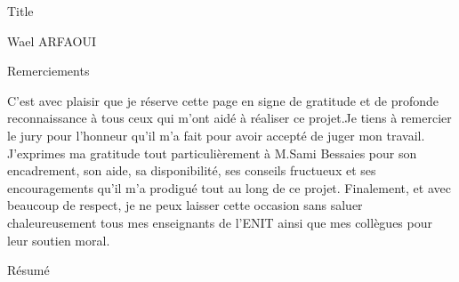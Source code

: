 \documentclass[11pt,fleqn]{book} %
\begin{document}
	\let\cleardoublepage\clearpage
	\begingroup
	\thispagestyle{empty}
	
	\centering
	\vspace*{9cm}
	\par\normalfont\fontsize{35}{35}\sffamily\selectfont
	Title\par %
	\vspace*{1cm}
	{\Huge Wael ARFAOUI}\par %
	\endgroup
	
	\frontmatter
	
	
	\begin{center}
		\vspace*{5cm}
		\par\normalfont\fontsize{20}{20}\sffamily\selectfont
		Remerciements
		\par\normalfont\fontsize{14}{14}\sffamily\selectfont
		\vspace*{1cm}
		C’est avec plaisir que je réserve cette page en signe de gratitude et de
		profonde reconnaissance à tous ceux qui m'ont aidé à réaliser ce projet.Je tiens à remercier le jury pour l’honneur qu’il m'a fait pour avoir accepté de juger mon travail. J'exprimes ma gratitude tout particulièrement à M.Sami Bessaies pour son encadrement, son aide, sa disponibilité, ses conseils fructueux et ses encouragements qu’il m'a prodigué tout au long de ce projet.	Finalement, et avec beaucoup de respect, je ne peux laisser cette occasion sans saluer chaleureusement tous mes enseignants de l’ENIT ainsi que mes collègues pour leur soutien moral.\par
	\end{center}
	
	
	
	\newpage
	\begin{center}
		\vspace*{5cm}
		\normalfont
		{\LARGE Résumé}
		\vspace*{1cm}
	\end{center}
	
\end{document}

